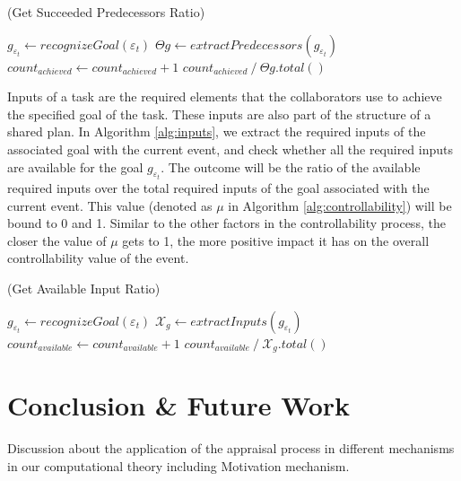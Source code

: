 \documentclass[letterpaper]{article}
\begin{document}
\renewcommand\thealgorithm{4\alph{algorithm}}
\setcounter{algorithm}{2}

\begin{algorithm}
	\caption{(Get Succeeded Predecessors Ratio)}
	\label{alg:predecessors}
	\begin{algorithmic}[1]
			\Statex
			\State $\mathit{g}_{\varepsilon_t} \gets
			\textit{recognizeGoal}{(\varepsilon_t)}$
			\Statex
				\State {}
			\EndIf
			\Statex
			\State $\Theta{\mathit{g}} \gets
			\textit{extractPredecessors}{(\mathit{g}_{\varepsilon_t})}$
			\Statex
					\State $count_{achieved} \gets count_{achieved} + 1$
				\EndIf
			\EndFor
			\Statex
			\State \Return
			${count_{achieved} \mathbin{/} {\Theta{\mathit{g}}.total()}}$
		\EndFunction 
	\end{algorithmic}
\end{algorithm}

Inputs of a task are the required elements that the collaborators use to
achieve the specified goal of the task. These inputs are also part of the
structure of a shared plan. In Algorithm \ref{alg:inputs}, we extract the
required inputs of the associated goal with the current event, and check whether
all the required inputs are available for the goal $\mathit{g}_{\varepsilon_t}$.
The outcome will be the ratio of the available required inputs over the total
required inputs of the goal associated with the current event. This value
(denoted as $\mu$ in Algorithm \ref{alg:controllability}) will be bound to 0 and
1. Similar to the other factors in the controllability process, the closer the
value of $\mu$ gets to 1, the more positive impact it has on the overall
controllability value of the event.

\renewcommand\thealgorithm{4\alph{algorithm}}
\setcounter{algorithm}{3}

\begin{algorithm}
	\caption{(Get Available Input Ratio)}
	\label{alg:inputs}
	\begin{algorithmic}[1]
			\Statex
			\State $\mathit{g}_{\varepsilon_t} \gets
			\textit{recognizeGoal}{(\varepsilon_t)}$
			\Statex
				\State {}
			\EndIf
			\Statex
			\State $\mathcal{X}_{\mathit{g}} \gets
			\textit{extractInputs}{(\mathit{g}_{\varepsilon_t})}$
			\Statex
					\State $count_{available} \gets count_{available} + 1$
				\EndIf
			\EndFor
			\Statex
			\State \Return
			${count_{available} \mathbin{/} \mathcal{X}_{\mathit{g}}.total()}$
		\EndFunction 
	\end{algorithmic}
\end{algorithm}

\section{Conclusion \& Future Work}

Discussion about the application of the appraisal process in different
mechanisms in our computational theory including Motivation mechanism. 



\end{document}
